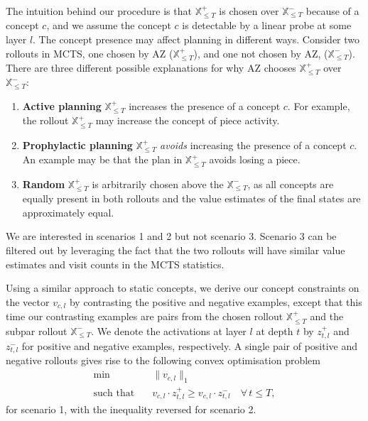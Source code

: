\documentclass{article}
\def\Xset{\mathbb{X}}
\def\vcl{v_{c,l}}
\def\xp{\Xset^+_{\leq T}}
\def\xm{\Xset^-_{\leq T}}
\begin{document}
The intuition behind our procedure is that $\xp$ is chosen over $\xm$ because of a concept $c$, and we assume the concept $c$ is detectable by a linear probe at some layer $l$. 
The concept presence may affect planning in different ways. 
Consider two rollouts in MCTS, one chosen by AZ ($\xp$), and one not chosen by AZ, ($\xm$). 
There are three different possible explanations for why AZ chooses $\xp$ over $\xm$:
\begin{enumerate}
    \item \textbf{Active planning} $\xp$ increases the presence of a concept $c$.
    For example, the rollout $\xp$ may increase the concept of piece activity.
    \item \textbf{Prophylactic planning} $\xp$ \textit{avoids} increasing the presence of a concept $c$.
    An example may be that the plan in $\xp$ avoids losing a piece.
    \item \textbf{Random} $\xp$ is arbitrarily chosen above the $\xm$, as all concepts are equally present in both rollouts and the value estimates of the final states are approximately equal.
\end{enumerate}
 
We are interested in scenarios 1 and 2 but not scenario 3. Scenario 3 can be filtered out 
by leveraging the fact that the two rollouts will have similar value estimates and visit counts in the MCTS statistics. 

Using a similar approach to static concepts, we derive our concept constraints on the vector $\vcl$ by contrasting the positive and negative examples, except that this time our contrasting examples are pairs from the chosen rollout $\xp$ and the subpar rollout $\xm$. We denote the activations at layer $l$ at depth $t$ by $z^+_{t, l}$ and $z^-_{t, l}$ for positive and negative examples, respectively. A single pair of positive and negative rollouts gives rise to the following convex optimisation problem
\begin{align} 
    \min & \quad \| \vcl \|_1 \label{eq:dynamic_concept} \\
     \textrm{such that} & \quad \vcl \cdot z^+_{t, l} \geq \vcl \cdot z^-_{t, l} \quad  \forall \, t\leq T, \label{eq:dynamic-conv-opt}
\end{align}
for scenario 1, with the inequality reversed for scenario 2.   
\end{document}
